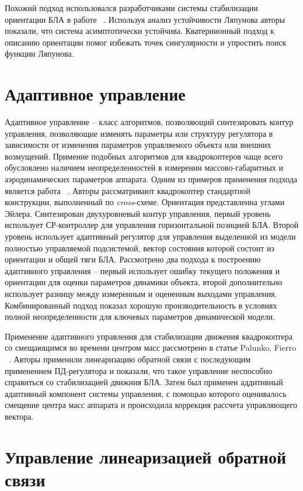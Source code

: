 Похожий подход использовался разработчиками системы стабилизации ориентации БЛА в работе ~\cite{Huo01}. Используя анализ устойчивости Ляпунова авторы показали, что система асимптотически устойчива. Кватернионный подход к описанию ориентации помог избежать точек сингулярности и упростить поиск функции Ляпунова.

\section{Адаптивное управление}

Адаптивное управление -- класс алгоритмов, позволяющий синтезировать контур управления, позволяющие изменять параметры или структуру регулятора в зависимости от изменения параметров управляемого объекта или внешних возмущений. Примение подобных алгоритмов для квадрокоптеров чаще всего обусловлено наличием неопределенностей в измерении массово-габаритных и аэродинамических параметров аппарата.
Одним из примеров применения подхода является работа ~\cite{Huo01}. Авторы рассматривают квадрокоптер стандартной конструкции, выполненный по \textit{cross}-схеме. Ориентация представленна углами Эйлера. Синтезирован двухуровневый контур управления, первый уровень использует СР-контроллер для управления горизонтальной позицией БЛА. Второй уровень использует адаптивный регулятор для управления выделенной из модели полностью управляемой подсистемой, вектор состояния которой состоит из ориентации и общей тяги БЛА. Рассмотрено два подхода к построению адаптивного управления -- первый использует ошибку текущего положения и ориентации для оценки параметров динамики объекта, второй дополнительно использует разницу между измеренным и оцененным выходами управления. Комбинированный подход показал хорошую производительность в условиях полной неопределенности для ключевых параметров динамической модели.

Применение адаптивного управления для стабилизации движения квадрокоптера со смещающимся во времени центром масс рассмотрено в статье Palunko, Fierro ~\cite{Palunko01}. Авторы применили линеаризацию обратной связи с последующим применением ПД-регулятора и показали, что такое управление неспособно справиться со стабилизацией движния БЛА. Затем был применен аддитивный адаптивный компонент системы управления, с помощью которого оценивалось смещение центра масс аппарата и происходила коррекция рассчета управляющего вектора.

\section{Управление линеаризацией обратной связи}


